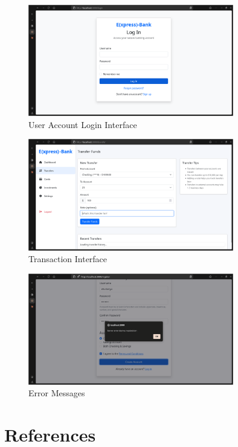 \documentclass[12pt,a4paper]{report}
\begin{document}
\begin{figure}[h]
    \centering
    \includegraphics[width=0.8\textwidth]{login.png}
    \caption{User Account Login Interface}
\end{figure}

\begin{figure}[h]
    \centering
    \includegraphics[width=0.8\textwidth]{transfers.png}
    \caption{Transaction Interface}
\end{figure}

\begin{figure}[h]
    \centering
    \includegraphics[width=0.8\textwidth]{error.png}
    \caption{Error Messages}
\end{figure}

\chapter{References}
\end{document}
